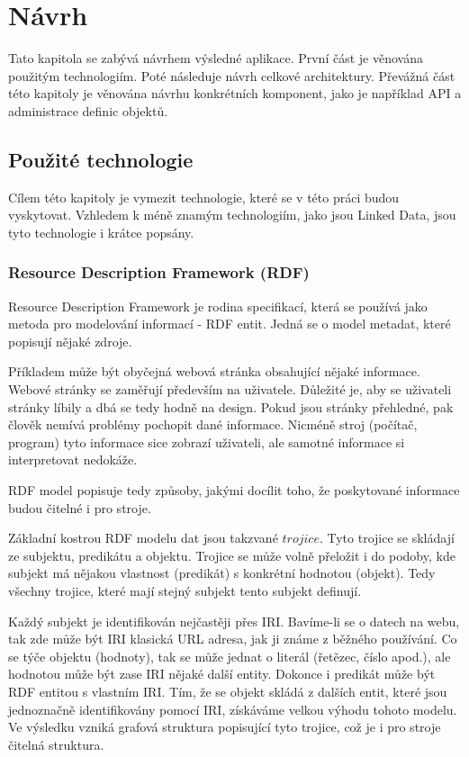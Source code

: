 \documentclass[thesis=B,czech]{FITthesis}[2012/06/26]
\begin{document}
 \chapter{Návrh}
 Tato kapitola se zabývá návrhem výsledné aplikace. První část je věnována použitým technologiím. Poté následuje návrh celkové architektury.
 Převážná část této kapitoly je věnována návrhu konkrétních komponent, jako je například API a administrace definic objektů.
 
 
 \section{Použité technologie}
 Cílem této kapitoly je vymezit technologie, které se v této práci budou vyskytovat. Vzhledem k méně znamým technologiím, jako jsou Linked Data,
 jsou tyto technologie i krátce popsány.
 
 \subsection{Resource Description Framework (RDF)}
 Resource Description Framework je rodina specifikací, která se používá jako metoda pro modelování informací - RDF entit.
 Jedná se o model metadat, které popisují nějaké zdroje.
 
 Příkladem může být obyčejná webová stránka obsahující nějaké informace. Webové stránky se zaměřují především na uživatele.
 Důležité je, aby se uživateli stránky líbily a dbá se tedy hodně na design. Pokud jsou stránky přehledné, pak člověk nemívá problémy pochopit
 dané informace. Nicméně stroj (počítač, program) tyto informace sice zobrazí uživateli, ale samotné informace si interpretovat nedokáže.
 
 RDF model popisuje tedy způsoby, jakými docílit toho, že poskytované informace budou čitelné i pro stroje.
 
 Základní kostrou RDF modelu dat jsou takzvané $trojice$. Tyto trojice se skládají ze subjektu, predikátu a objektu.
 Trojice se může volně přeložit i do podoby, kde subjekt má nějakou vlastnost (predikát) s konkrétní hodnotou (objekt). Tedy všechny trojice, které mají
 stejný subjekt tento subjekt definují.
 
 Každý subjekt je identifikován nejčastěji přes IRI. Bavíme-li se o datech na webu, tak zde může být IRI klasická URL adresa, jak ji známe
 z běžného používání. Co se týče objektu (hodnoty), tak se může jednat o literál (řetězec, číslo apod.), ale hodnotou může být zase IRI nějaké další entity.
 Dokonce i predikát může být RDF entitou s vlastním IRI. Tím, že se objekt skládá z dalších entit, které jsou jednoznačně identifikovány pomocí IRI, získáváme velkou výhodu
 tohoto modelu. Ve výsledku vzniká grafová struktura popisující tyto trojice, což je i pro stroje čitelná struktura.
 
\end{document}
